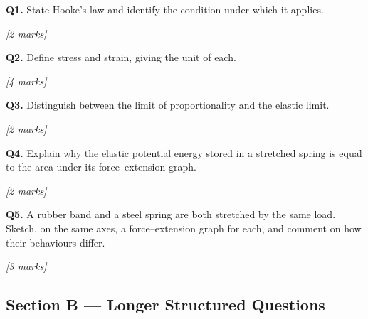 \begin{tcolorbox}[colback=white, colframe=midblue, breakable]

\begin{minipage}{\linewidth}
\textbf{Q1.} State Hooke's law and identify the condition under which it applies.
\par\hfill\textit{[2 marks]}
\vspace{2.5cm}
\end{minipage}

\begin{minipage}{\linewidth}
\textbf{Q2.} Define stress and strain, giving the unit of each.
\par\hfill\textit{[4 marks]}
\vspace{3cm}
\end{minipage}

\begin{minipage}{\linewidth}
\textbf{Q3.} Distinguish between the limit of proportionality and the elastic limit.
\par\hfill\textit{[2 marks]}
\vspace{2.5cm}
\end{minipage}

\begin{minipage}{\linewidth}
\textbf{Q4.} Explain why the elastic potential energy stored in a stretched spring is equal to the area under its force--extension graph.
\par\hfill\textit{[2 marks]}
\vspace{3cm}
\end{minipage}

\begin{minipage}{\linewidth}
\textbf{Q5.} A rubber band and a steel spring are both stretched by the same load. Sketch, on the same axes, a force--extension graph for each, and comment on how their behaviours differ.
\par\hfill\textit{[3 marks]}
\vspace{5cm}
\end{minipage}

\end{tcolorbox}

\subsection*{Section B — Longer Structured Questions}

